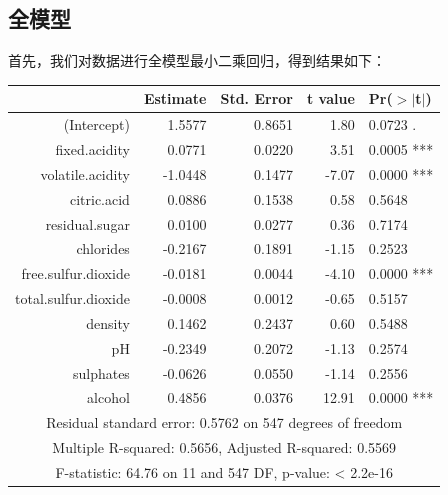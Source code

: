 \documentclass[fontset=ubuntu]{ctexart}
\begin{document}
        \subsection{全模型}
            首先，我们对数据进行全模型最小二乘回归，得到结果如下：
            \begin{table}[htbp]
                \centering
                \begin{tabular}{rrrrl}
                    \hline
                    & Estimate & Std. Error & t value & Pr($>$$|$t$|$) \\ 
                    \hline
                    (Intercept) & 1.5577 & 0.8651 & 1.80 & 0.0723 . \\ 
                    fixed.acidity & 0.0771 & 0.0220 & 3.51 & 0.0005 *** \\ 
                    volatile.acidity & -1.0448 & 0.1477 & -7.07 & 0.0000 *** \\ 
                    citric.acid & 0.0886 & 0.1538 & 0.58 & 0.5648 \\ 
                    residual.sugar & 0.0100 & 0.0277 & 0.36 & 0.7174 \\ 
                    chlorides & -0.2167 & 0.1891 & -1.15 & 0.2523 \\ 
                    free.sulfur.dioxide & -0.0181 & 0.0044 & -4.10 & 0.0000 *** \\ 
                    total.sulfur.dioxide & -0.0008 & 0.0012 & -0.65 & 0.5157 \\ 
                    density & 0.1462 & 0.2437 & 0.60 & 0.5488 \\ 
                    pH & -0.2349 & 0.2072 & -1.13 & 0.2574 \\ 
                    sulphates & -0.0626 & 0.0550 & -1.14 & 0.2556 \\ 
                    alcohol & 0.4856 & 0.0376 & 12.91 & 0.0000 *** \\ 
                    \hline
                    \multicolumn{5}{c}{Residual standard error: 0.5762 on 547 degrees of freedom} \\
                    \multicolumn{5}{c}{Multiple R-squared:  0.5656,	Adjusted R-squared:  0.5569} \\
                    \multicolumn{5}{c}{F-statistic: 64.76 on 11 and 547 DF,  p-value: < 2.2e-16} \\
                    \hline
                \end{tabular}
                \label{tab:linear-model}
            \end{table}
            
\end{document}
